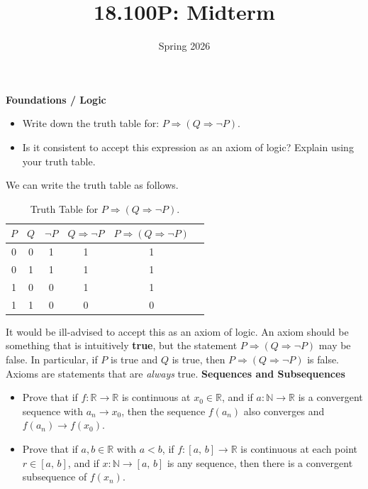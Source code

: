 \documentclass{article}
\title{18.100P: Midterm}
\date{Spring 2026}
\begin{document}
    \maketitle
    \textbf{Foundations / Logic}
    \begin{itemize}
        \item
            Write down the truth table for:
            $P\Rightarrow(Q\Rightarrow\neg{P})$.
        \item
            Is it consistent to accept this expression
            as an axiom of logic? Explain using your truth table.
    \end{itemize}
    \color{blue}
    We can write the truth table as follows.
    \begin{table}[H]
        \centering
        \color{blue}
        \begin{tabular}{cc|cccc}
            $P$
                &
                $Q$
                &
                $\neg{P}$
                &
                $Q\Rightarrow\neg{P}$
                &
                $P\Rightarrow(Q\Rightarrow\neg{P})$\\
            \hline
            0&0&1&1&1\\
            0&1&1&1&1\\
            1&0&0&1&1\\
            1&1&0&0&0
        \end{tabular}
        \caption{Truth Table for $P\Rightarrow(Q\Rightarrow\neg{P})$.}
    \end{table}
    It would be ill-advised to accept this as an axiom of logic. An axiom
    should be something that is intuitively \textbf{true}, but the statement
    $P\Rightarrow(Q\Rightarrow\neg{P})$ may be false. In particular, if $P$ is
    true and $Q$ is true, then $P\Rightarrow(Q\Rightarrow\neg{P})$ is false.
    Axioms are statements that are \textit{always} true.
    \color{black}
    \clearpage
    \textbf{Sequences and Subsequences}
    \begin{itemize}
        \item
            Prove that if $f:\mathbb{R}\rightarrow\mathbb{R}$ is continuous
            at $x_{0}\in\mathbb{R}$, and if $a:\mathbb{N}\rightarrow\mathbb{R}$
            is a convergent sequence with
            $a_{n}\rightarrow{x}_{0}$, then the sequence
            $f(a_{n})$ also converges and $f(a_{n})\rightarrow{f}(x_{0})$.
        \item
            Prove that if $a,b\in\mathbb{R}$ with $a<b$, if
            $f:[a,\,b]\rightarrow\mathbb{R}$ is continuous at each point
            $r\in[a,\,b]$, and if $x:\mathbb{N}\rightarrow[a,\,b]$
            is any sequence, then there is a convergent subsequence of
            $f(x_{n})$.
    \end{itemize}
\end{document}
